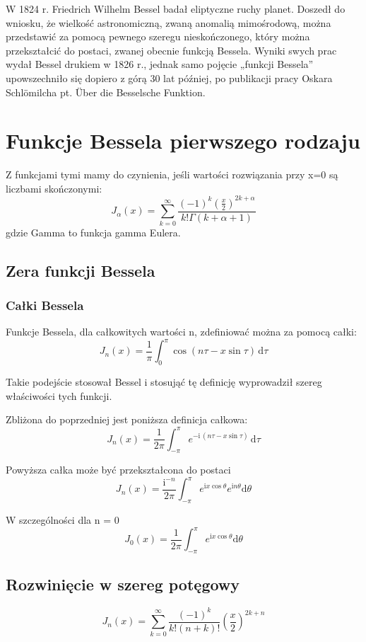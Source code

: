 \documentclass{article}
\begin{document}
W 1824 r. Friedrich Wilhelm Bessel badał eliptyczne ruchy planet. Doszedł do wniosku, że wielkość astronomiczną, zwaną anomalią mimośrodową, można przedstawić za pomocą pewnego szeregu nieskończonego, który można przekształcić do postaci, zwanej obecnie funkcją Bessela. Wyniki swych prac wydał Bessel drukiem w 1826 r., jednak samo pojęcie „funkcji Bessela” upowszechniło się dopiero z górą 30 lat później, po publikacji pracy Oskara Schlömilcha pt. Über die Besselsche Funktion. 

\section*{Funkcje Bessela pierwszego rodzaju}
Z funkcjami tymi mamy do czynienia, jeśli wartości rozwiązania przy x=0 są liczbami skończonymi: 
$$ J_{\alpha }(x)=\sum _{k=0}^{\infty }{\frac {(-1)^{k}\left({\frac {x}{2}}\right)^{2k+\alpha }}{k!\Gamma (k+\alpha +1)}} $$
gdzie Gamma to funkcja gamma Eulera. 

\subsection*{Zera funkcji Bessela}
\subsubsection*{Całki Bessela}
Funkcje Bessela, dla całkowitych wartości n, zdefiniować można za pomocą całki: 
\[ J_{n}(x)={\frac {1}{\pi }}\int _{0}^{\pi }\cos(n\tau -x\sin \tau )\,\mathrm {d} \tau \]

Takie podejście stosował Bessel i stosująć tę definicję wyprowadził szereg właściwości tych funkcji.

Zbliżona do poprzedniej jest poniższa definicja całkowa: 
\begin{displaymath}
J_{n}(x)={\frac {1}{2\pi }}\int _{-\pi }^{\pi }e^{-\mathrm {i} \,(n\tau -x\sin \tau )}\,\mathrm {d} \tau
\end{displaymath}

Powyższa całka może być przekształcona do postaci 
$$ J_{n}(x)={\frac {\mathrm {i} ^{-n}}{2\pi }}\int _{-\pi }^{\pi }e^{\mathrm {i} x\cos \theta }e^{\mathrm {i} n\theta }\mathrm {d} \theta $$

W szczególności dla n = 0
\[ J_{0}(x)={\frac {1}{2\pi }}\int _{-\pi }^{\pi }e^{\mathrm {i} x\cos \theta }\mathrm {d} \theta \]

\subsection*{Rozwinięcie w szereg potęgowy}
\begin{displaymath}
J_{n}(x)=\sum _{k=0}^{\infty }{\frac {(-1)^{k}}{k!(n+k)!}}\left({\frac {x}{2}}\right)^{2k+n}
\end{displaymath}
\end{document}
